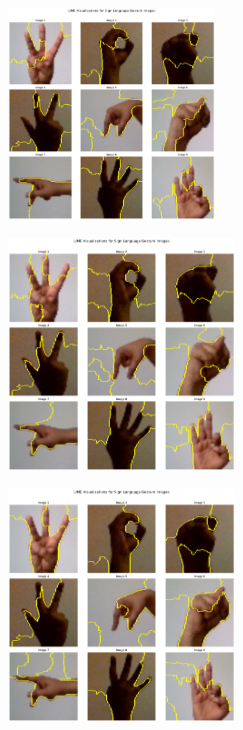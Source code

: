 \begin{multicols}{2}
\vspace{0.5cm}

\includegraphics[width=0.41\textwidth]{Assets/lime_visualization/DenseNet169.png}

\vspace{0.5cm}

\newpage

\includegraphics[width=0.45\textwidth]{Assets/lime_visualization/DENSENET201.png}

\vspace{0.8cm}

\includegraphics[width=0.45\textwidth]{Assets/lime_visualization/EfficientNetB0.png}

\vspace{0.8cm}



\end{multicols}
